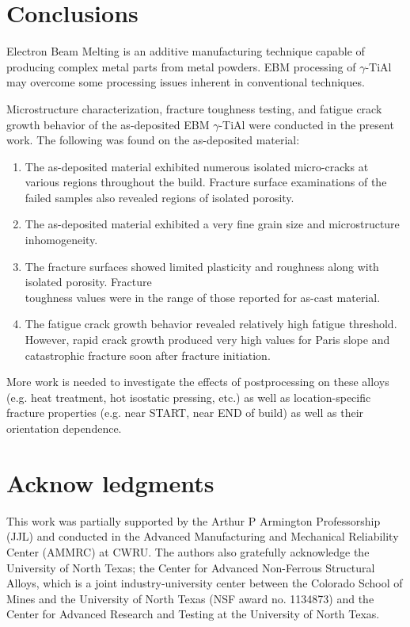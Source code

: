\documentclass[10pt]{article}
\begin{document}
\section*{Conclusions}
Electron Beam Melting is an additive manufacturing technique capable of producing complex metal parts from metal powders. EBM processing of $\gamma$-TiAl may overcome some processing issues inherent in conventional techniques.

Microstructure characterization, fracture toughness testing, and fatigue crack growth behavior of the as-deposited EBM $\gamma$-TiAl were conducted in the present work. The following was found on the as-deposited material:

\begin{enumerate}
  \item The as-deposited material exhibited numerous isolated micro-cracks at various regions throughout the build. Fracture surface examinations of the failed samples also revealed regions of isolated porosity.

  \item The as-deposited material exhibited a very fine grain size and microstructure inhomogeneity.

  \item The fracture surfaces showed limited plasticity and roughness along with isolated porosity. Fracture\\
toughness values were in the range of those reported for as-cast material.

  \item The fatigue crack growth behavior revealed relatively high fatigue threshold. However, rapid crack growth produced very high values for Paris slope and catastrophic fracture soon after fracture initiation.

\end{enumerate}

More work is needed to investigate the effects of postprocessing on these alloys (e.g. heat treatment, hot isostatic pressing, etc.) as well as location-specific fracture properties (e.g. near START, near END of build) as well as their orientation dependence.

\section*{Acknow ledgments}
This work was partially supported by the Arthur $\mathrm{P}$ Armington Professorship (JJL) and conducted in the Advanced Manufacturing and Mechanical Reliability Center (AMMRC) at CWRU. The authors also gratefully acknowledge the University of North Texas; the Center for Advanced Non-Ferrous Structural Alloys, which is a joint industry-university center between the Colorado School of Mines and the University of North Texas (NSF award no. 1134873) and the Center for Advanced Research and Testing at the University of North Texas.
\end{document}
